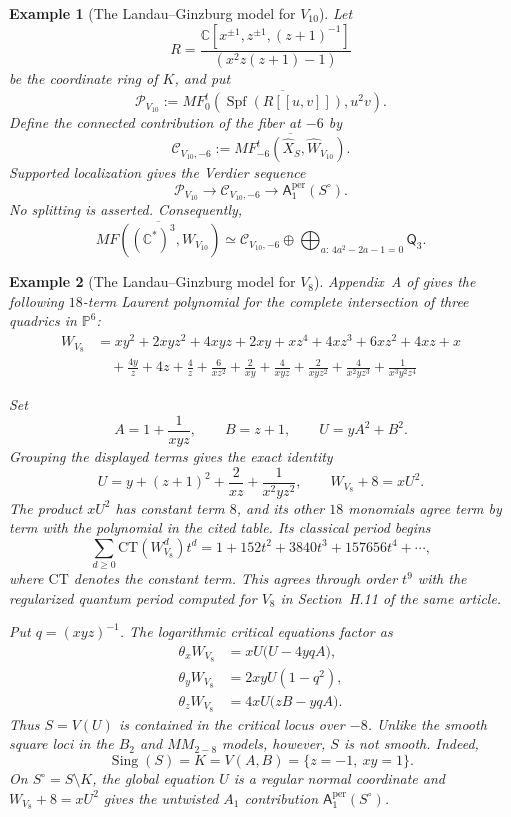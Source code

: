 \documentclass[11pt]{amsart}
\newtheorem{example}{Example}[section]
\DeclareMathOperator{\Sing}{Sing}
\newcommand{\MorseCat}[1]{\mathsf{Q}_{#1}}
\newcommand{\Aper}[2]{\mathsf{A}^{\mathrm{per}}_{#2}(#1)}
\begin{document}
\begin{example}[The Landau--Ginzburg model for $V_{10}$]
Let
\[
R=
\frac{\mathbb C[x^{\pm1},z^{\pm1},(z+1)^{-1}]}
{(x^2z(z+1)-1)}
\]
be the coordinate ring of $K$, and put
\[
\mathcal P_{V_{10}}
:=
\overline{MF^t_0\!\left(
\operatorname{Spf}(R[[u,v]]),u^2v
\right)}.
\]
Define the connected contribution of the fiber at $-6$ by
\[
\mathcal C_{V_{10},-6}
:=
\overline{MF^t_{-6}(\widehat X_S,\widehat W_{V_{10}})}.
\]
Supported localization gives the Verdier sequence
\[
\mathcal P_{V_{10}}
\longrightarrow
\mathcal C_{V_{10},-6}
\longrightarrow
\Aper{S^\circ}{1}.
\]
No splitting is asserted. Consequently,
\[
\overline{MF((\mathbb C^*)^3,W_{V_{10}})}
\simeq
\mathcal C_{V_{10},-6}
\oplus
\bigoplus_{a:\,4a^2-2a-1=0}\MorseCat{3}.
\]
\end{example}

\begin{example}[The Landau--Ginzburg model for $V_8$]
Appendix~A of \cite{CoatesCortiGalkinKasprzyk2016} gives the following
$18$-term Laurent polynomial for the complete intersection of three quadrics
in $\mathbb P^6$:
\begin{align*}
W_{V_{8}} &= xy^2 + 2xyz^2 + 4xyz + 2xy + xz^4 + 4xz^3 + 6xz^2 + 4xz + x \\
&\quad +\frac{4y}{z} + 4z + \frac{4}{z} + \frac{6}{xz^2} + \frac{2}{xy} + \frac{4}{xyz} + \frac{2}{xyz^2} + \frac{4}{x^2yz^3} + \frac{1}{x^3y^2z^4}
\end{align*}

Set
\[
A=1+\frac1{xyz},
\qquad
B=z+1,
\qquad
U=yA^2+B^2.
\]
Grouping the displayed terms gives the exact identity
\[
U=y+(z+1)^2+\frac{2}{xz}+\frac{1}{x^2yz^2},
\qquad
W_{V_8}+8=xU^2.
\]
The product $xU^2$ has constant term $8$, and its other $18$ monomials agree
term by term with the polynomial in the cited table. Its classical period
begins
\[
\sum_{d\geq0}\mathrm{CT}(W_{V_8}^d)t^d
=1+152t^2+3840t^3+157656t^4+\cdots,
\]
where $\mathrm{CT}$ denotes the constant term. This agrees through order
$t^9$ with the regularized quantum period computed for $V_8$ in
Section~H.11 of the same article.

Put $q=(xyz)^{-1}$. The logarithmic critical equations factor as
\[
\begin{aligned}
\theta_xW_{V_8}&=xU\bigl(U-4yqA\bigr),\\
\theta_yW_{V_8}&=2xyU(1-q^2),\\
\theta_zW_{V_8}&=4xU\bigl(zB-yqA\bigr).
\end{aligned}
\]
Thus $S=V(U)$ is contained in the critical locus over $-8$. Unlike the
smooth square loci in the $B_2$ and $MM_{2-8}$ models, however, $S$ is not
smooth. Indeed,
\[
\Sing(S)=K=V(A,B)
=\{z=-1,\ xy=1\}.
\]
On $S^\circ=S\setminus K$, the global equation $U$ is a regular normal
coordinate and $W_{V_8}+8=xU^2$ gives the untwisted $A_1$ contribution
$\Aper{S^\circ}{1}$.


\end{example}
\end{document}
